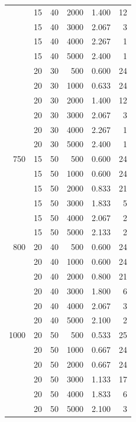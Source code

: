 \begin{longtable}{rrrrrr}
 & 15 & 40 & 2000 & 1.400 & 12 \\
 & 15 & 40 & 3000 & 2.067 & 3 \\
 & 15 & 40 & 4000 & 2.267 & 1 \\
 & 15 & 40 & 5000 & 2.400 & 1 \\
 & 20 & 30 & 500 & 0.600 & 24 \\
 & 20 & 30 & 1000 & 0.633 & 24 \\
 & 20 & 30 & 2000 & 1.400 & 12 \\
 & 20 & 30 & 3000 & 2.067 & 3 \\
 & 20 & 30 & 4000 & 2.267 & 1 \\
 & 20 & 30 & 5000 & 2.400 & 1 \\
\midrule
750 & 15 & 50 & 500 & 0.600 & 24 \\
 & 15 & 50 & 1000 & 0.600 & 24 \\
 & 15 & 50 & 2000 & 0.833 & 21 \\
 & 15 & 50 & 3000 & 1.833 & 5 \\
 & 15 & 50 & 4000 & 2.067 & 2 \\
 & 15 & 50 & 5000 & 2.133 & 2 \\
\midrule
800 & 20 & 40 & 500 & 0.600 & 24 \\
 & 20 & 40 & 1000 & 0.600 & 24 \\
 & 20 & 40 & 2000 & 0.800 & 21 \\
 & 20 & 40 & 3000 & 1.800 & 6 \\
 & 20 & 40 & 4000 & 2.067 & 3 \\
 & 20 & 40 & 5000 & 2.100 & 2 \\
\midrule
1000 & 20 & 50 & 500 & 0.533 & 25 \\
 & 20 & 50 & 1000 & 0.667 & 24 \\
 & 20 & 50 & 2000 & 0.667 & 24 \\
 & 20 & 50 & 3000 & 1.133 & 17 \\
 & 20 & 50 & 4000 & 1.833 & 6 \\
 & 20 & 50 & 5000 & 2.100 & 3 \\
\end{longtable}

